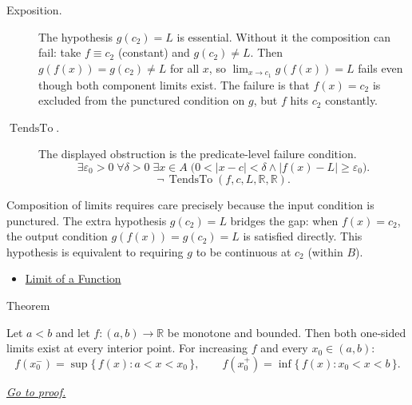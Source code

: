 \begin{remark*}
\begin{description}
  \item[Exposition.]
The hypothesis $g(c_2) = L$ is essential. Without it the composition
can fail: take $f \equiv c_2$ (constant) and $g(c_2) \neq L$.
Then $g(f(x)) = g(c_2) \neq L$ for all $x$, so
$\lim_{x\to c_1}g(f(x))=L$ fails even
though both component limits exist. The failure is that $f(x) = c_2$
is excluded from the punctured condition on $g$, but $f$ hits $c_2$
constantly.


  \item[\(\operatorname{TendsTo}.\)]
  The displayed obstruction is the predicate-level failure condition.
  \[
  \exists\varepsilon_0>0\;\forall\delta>0\;\exists x\in A\;
  \bigl(0<|x-c|<\delta\land |f(x)-L|\ge\varepsilon_0\bigr).
  \]
  \[
  \neg\,\operatorname{TendsTo}(f,c,L,\mathbb{R},\mathbb{R}).
  \]
\end{description}
\end{remark*}

\begin{remark*}[Interpretation]
Composition of limits requires care precisely because the input
condition is punctured. The extra hypothesis $g(c_2) = L$ bridges the
gap: when $f(x) = c_2$, the output condition $g(f(x)) = g(c_2) = L$
is satisfied directly. This hypothesis is equivalent to requiring $g$
to be continuous at $c_2$ (within $B$).
\end{remark*}

\begin{dependencies}
\begin{itemize}
  \item \hyperref[def:limit-function]{Limit of a Function}
\end{itemize}
\end{dependencies}


\begin{theorembox}{Theorem}
\begin{theorem}
\label{thm:monotone-limit-theorem}
Let $a < b$ and let $f : (a,b) \to \mathbb{R}$ be monotone and
bounded. Then both one-sided limits exist at every interior point.
For increasing $f$ and every $x_0 \in (a,b)$:
\[
  f(x_0^-) = \sup\{\,f(x) : a < x < x_0\,\},
  \qquad
  f(x_0^+) = \inf\{\,f(x) : x_0 < x < b\,\}.
\]

\smallskip\noindent
\hyperref[prf:monotone-limit-theorem]{\textit{Go to proof.}}
\end{theorem}
\end{theorembox}

